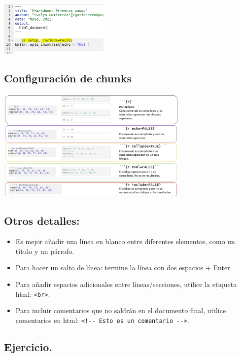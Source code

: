 \documentclass[
]{article}
\begin{document}
\includegraphics[width=0.4\textwidth,height=\textheight]{images/global.png}

\hypertarget{configuraciuxf3n-de-chunks}{%
\subsection{Configuración de chunks}\label{configuraciuxf3n-de-chunks}}

\includegraphics[width=0.7\textwidth,height=\textheight]{images/chunks.png}

\hypertarget{otros-detalles}{%
\subsection{Otros detalles:}\label{otros-detalles}}

\begin{itemize}
\item
  Es mejor añadir una línea en blanco entre diferentes elementos, como
  un título y un párrafo.
\item
  Para hacer un salto de línea: termine la línea con dos espacios +
  Enter.
\item
  Para añadir espacios adicionales entre líneas/secciones, utilice la
  etiqueta html: \texttt{\textless{}br\textgreater{}}.
\item
  Para incluir comentarios que no saldrán en el documento final, utilice
  comentarios en html:
  \texttt{\textless{}!-\/-\ Esto\ es\ un\ comentario\ -\/-\textgreater{}}.
\end{itemize}

\hypertarget{ejercicio.}{%
\subsection{Ejercicio. 👩‍💻 👨‍💻}\label{ejercicio.}}
\end{document}
